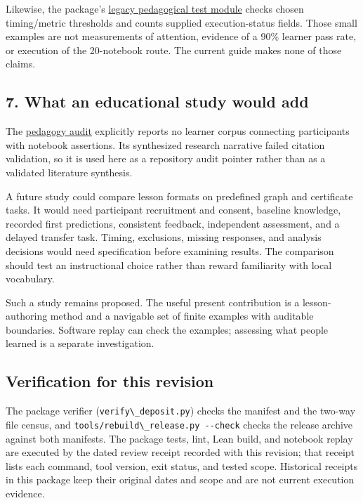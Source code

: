 \documentclass[
  11pt,
]{article}
\newcommand{\passthrough}[1]{#1}
\begin{document}
Likewise, the package's
\href{https://github.com/dbccpage/the_symbol_game/blob/52cb5457f6c485ba548cfd292f6012a941ed22cf/atlas/coda_atlas/symbol_game/007_pfp_executable_lessons_and_evidence_boundaries/code/tests/test_007_pedagogical_transmission.py}{legacy
pedagogical test module} checks chosen timing/metric thresholds and
counts supplied execution-status fields. Those small examples are not
measurements of attention, evidence of a 90\% learner pass rate, or
execution of the 20-notebook route. The current guide makes none of
those claims.

\subsection{7. What an educational study would
add}\label{what-an-educational-study-would-add}

The
\href{https://github.com/dbccpage/the_symbol_game/blob/52cb5457f6c485ba548cfd292f6012a941ed22cf/education/pedagogy/teaching_and_learning_findings.md}{pedagogy
audit} explicitly reports no learner corpus connecting participants with
notebook assertions. Its synthesized research narrative failed citation
validation, so it is used here as a repository audit pointer rather than
as a validated literature synthesis.

A future study could compare lesson formats on predefined graph and
certificate tasks. It would need participant recruitment and consent,
baseline knowledge, recorded first predictions, consistent feedback,
independent assessment, and a delayed transfer task. Timing, exclusions,
missing responses, and analysis decisions would need specification
before examining results. The comparison should test an instructional
choice rather than reward familiarity with local vocabulary.

Such a study remains proposed. The useful present contribution is a
lesson-authoring method and a navigable set of finite examples with
auditable boundaries. Software replay can check the examples; assessing
what people learned is a separate investigation.

\subsection{Verification for this
revision}\label{verification-for-this-revision}

The package verifier (\passthrough{\lstinline!verify\_deposit.py!})
checks the manifest and the two-way file census, and
\passthrough{\lstinline!tools/rebuild\_release.py --check!} checks the
release archive against both manifests. The package tests, lint, Lean
build, and notebook replay are executed by the dated review receipt
recorded with this revision; that receipt lists each command, tool
version, exit status, and tested scope. Historical receipts in this
package keep their original dates and scope and are not current
execution evidence.
\end{document}
